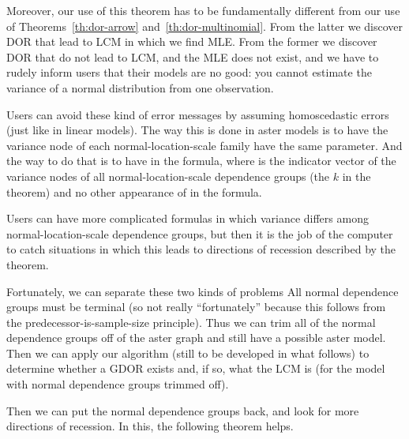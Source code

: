 Moreover, our use of this theorem has to be fundamentally different from
our use of Theorems~\ref{th:dor-arrow} and~\ref{th:dor-multinomial}.
From the latter we discover DOR that lead to LCM in which we find MLE.
From the former we discover DOR that do not lead to LCM, and the MLE
does not exist, and we have to rudely inform users that their models
are no good: you cannot estimate the variance of a normal distribution
from one observation.

Users can avoid these kind of error messages by assuming homoscedastic
errors (just like in linear models).  The way this is done in aster models
is to have the variance node of each normal-location-scale family
have the same parameter.  And the way to do that is to have 
in the formula, where  is the indicator vector of the variance
nodes of all normal-location-scale dependence groups (the $k$ in the theorem)
and no other appearance of  in the formula.

Users can have more complicated formulas in which variance differs among
normal-location-scale dependence groups, but then it is the job of the
computer to catch situations in which this leads to directions of recession
described by the theorem.

Fortunately, we can separate these two kinds of problems
All normal dependence groups must be terminal (so not really
``fortunately'' because this follows from the predecessor-is-sample-size
principle). 
Thus we can trim all of the normal dependence groups off of the aster graph
and still have a possible aster model.
Then we can apply our algorithm (still to be developed in what follows)
to determine whether a GDOR exists and, if so, what the LCM is
(for the model with normal dependence groups trimmed off).

Then we can put the normal dependence groups back, and look for more
directions of recession.  In this, the following theorem helps.

